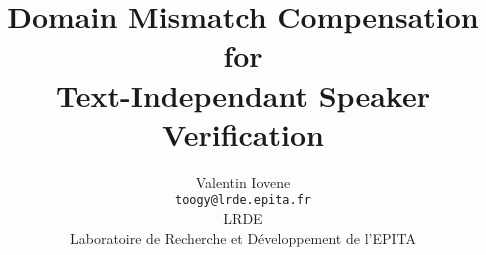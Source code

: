 \documentclass[12pt]{article}
\begin{document}

\title{Domain Mismatch Compensation for \\Text-Independant Speaker Verification}
\author{Valentin Iovene\\\texttt{toogy@lrde.epita.fr}\\LRDE\\Laboratoire de Recherche et Développement de l'EPITA}

\maketitle



\tableofcontents






\end{document}
